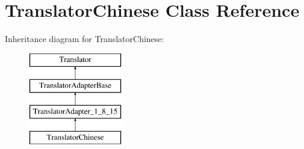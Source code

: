 \hypertarget{class_translator_chinese}{}\section{Translator\+Chinese Class Reference}
\label{class_translator_chinese}
Inheritance diagram for Translator\+Chinese\+:\begin{figure}[H]
\begin{center}
\leavevmode
\includegraphics[height=4.000000cm]{class_translator_chinese}
\end{center}
\end{figure}

